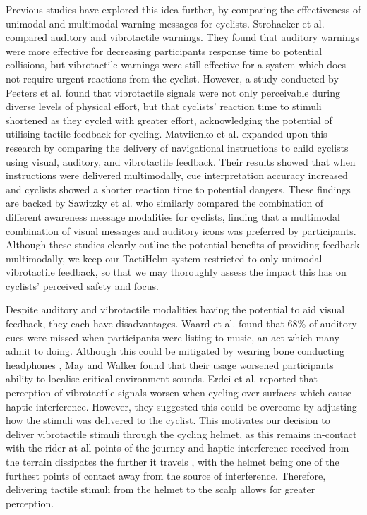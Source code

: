 \documentclass{mpaper}
\begin{document}
Previous studies have explored this idea further, by comparing the effectiveness of unimodal and multimodal warning messages for cyclists. Strohaeker et al. \cite{STROHAEKER2022151} compared auditory and vibrotactile warnings. They found that auditory warnings were more effective for decreasing participants response time to potential collisions, but vibrotactile warnings were still effective for a system which does not require urgent reactions from the cyclist. However, a study conducted by Peeters et al. \cite{peeters2019vibrotactile} found that vibrotactile signals were not only perceivable during diverse levels of physical effort, but that cyclists' reaction time to stimuli shortened as they cycled with greater effort, acknowledging the potential of utilising tactile feedback for cycling. Matviienko et al. \cite{10.1145/3290605.3300850, 10.1145/3229434.3229479} expanded upon this research by comparing the delivery of navigational instructions to child cyclists using visual, auditory, and vibrotactile feedback. Their results showed that when instructions were delivered multimodally, cue interpretation accuracy increased and cyclists showed a shorter reaction time to potential dangers. These findings are backed by Sawitzky et al. \cite{10.1145/3490099.3511127, mti6010003} who similarly compared the combination of different awareness message modalities for cyclists, finding that a multimodal combination of visual messages and auditory icons was preferred by participants. 
Although these studies clearly outline the potential benefits of providing feedback multimodally, we keep our TactiHelm system restricted to only unimodal vibrotactile feedback, so that we may thoroughly assess the impact this has on cyclists' perceived safety and focus.

Despite auditory and vibrotactile modalities having the potential to aid visual feedback, they each have disadvantages. Waard et al. \cite{DEWAARD2011626} found that 68\% of auditory cues were missed when participants were listing to music, an act which many admit to doing. Although this could be mitigated by wearing bone conducting headphones \cite{wolfe2016distracted}, May and Walker \cite{may2017effects} found that their usage worsened participants ability to localise critical environment sounds. Erdei et al. \cite{erdei2020comparing, doi:10.1080/15389588.2021.1985113} reported that perception of vibrotactile signals worsen when cycling over surfaces which cause haptic interference. However, they suggested this could be overcome by adjusting how the stimuli was delivered to the cyclist. This motivates our decision to deliver vibrotactile stimuli through the cycling helmet, as this remains in-contact with the rider at all points of the journey and haptic interference received from the terrain dissipates the further it travels \cite{9415164}, with the helmet being one of the furthest points of contact away from the source of interference. Therefore, delivering tactile stimuli from the helmet to the scalp allows for greater perception.
\end{document}
